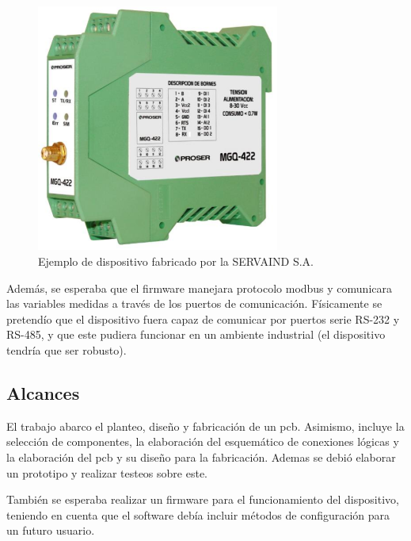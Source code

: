 \begin{figure}[h]
	\centering
	\includegraphics[width=80mm,keepaspectratio]{Figures/dispositivo_empresa.png}
	\caption{Ejemplo de dispositivo fabricado por la SERVAIND S.A.}
	\label{fig:disp_emp}
\end{figure}

Además, se esperaba que el firmware manejara protocolo modbus y comunicara las variables medidas a través de los puertos de comunicación. Físicamente se pretendío que el dispositivo fuera capaz de comunicar por puertos serie RS-232 y RS-485, y que este pudiera funcionar en un ambiente industrial (el dispositivo tendría que ser robusto).


\subsection{Alcances}



El trabajo abarco el planteo, diseño y fabricación de un pcb. Asimismo, incluye la selección de componentes, la elaboración del esquemático de conexiones lógicas y la elaboración del pcb y su diseño para la fabricación. Ademas se debió elaborar un prototipo y realizar testeos sobre este.

También se esperaba realizar un firmware para el funcionamiento del dispositivo, teniendo en cuenta que el software debía incluir métodos de configuración para un futuro usuario.





